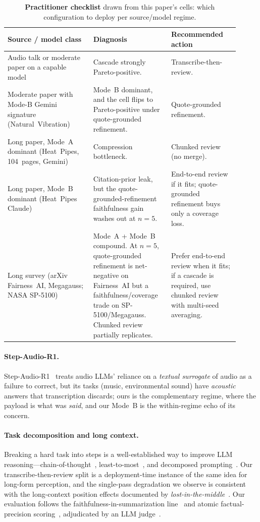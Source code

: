 \documentclass[11pt]{article}
\begin{document}
\begin{table}[!t]
\small
\centering
\caption{\textbf{Practitioner checklist} drawn from this paper's cells: which configuration to deploy per source/model regime.}
\label{tab:checklist}
\begin{tabular}{p{0.34\linewidth}p{0.30\linewidth}p{0.27\linewidth}}
\toprule
Source / model class & Diagnosis & Recommended action \\
\midrule
Audio talk or moderate paper on a capable model & Cascade strongly Pareto-positive. & Transcribe-then-review. \\
Moderate paper with Mode-B Gemini signature (Natural~Vibration) & Mode~B dominant, and the cell flips to Pareto-positive under quote-grounded refinement. & Quote-grounded refinement. \\
Long paper, Mode~A dominant (Heat~Pipes, 104~pages, Gemini) & Compression bottleneck. & Chunked review (no merge). \\
Long paper, Mode~B dominant (Heat~Pipes Claude) & Citation-prior leak, but the quote-grounded-refinement faithfulness gain washes out at $n{=}5$. & End-to-end review if it fits; quote-grounded refinement buys only a coverage loss. \\
Long survey (arXiv Fairness~AI, Megagauss; NASA SP-5100) & Mode~A + Mode~B compound. At $n{=}5$, quote-grounded refinement is net-negative on Fairness~AI but a faithfulness/coverage trade on SP-5100/Megagauss. Chunked review partially replicates. & Prefer end-to-end review when it fits; if a cascade is required, use chunked review with multi-seed averaging. \\
\bottomrule
\end{tabular}
\end{table}

\paragraph{Step-Audio-R1.} Step-Audio-R1~\cite{stepaudior1} treats audio LLMs' reliance on a \emph{textual surrogate} of audio as a failure to correct, but its tasks (music, environmental sound) have \emph{acoustic} answers that transcription discards; ours is the complementary regime, where the payload is what was \emph{said}, and our Mode~B is the within-regime echo of its concern.

\paragraph{Task decomposition and long context.} Breaking a hard task into steps is a well-established way to improve LLM reasoning---chain-of-thought~\cite{wei2022cot}, least-to-most~\cite{zhou2022ltm}, and decomposed prompting~\cite{khot2022decomp}. Our transcribe-then-review split is a deployment-time instance of the same idea for long-form perception, and the single-pass degradation we observe is consistent with the long-context position effects documented by \emph{lost-in-the-middle}~\cite{liu2024lost}. Our evaluation follows the faithfulness-in-summarization line~\cite{maynez2020faithful} and atomic factual-precision scoring~\cite{min2023factscore}, adjudicated by an LLM judge~\cite{zheng2023judge}.
\end{document}
